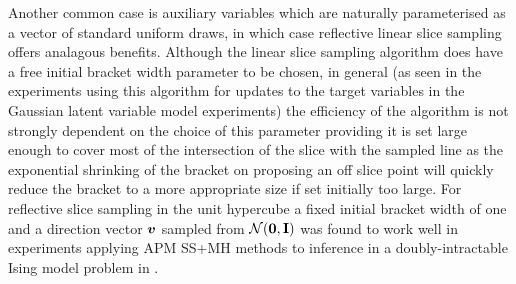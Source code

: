 Another common case is auxiliary variables which are naturally parameterised as a vector of standard uniform draws, in which case reflective linear slice sampling offers analagous benefits. Although the linear slice sampling algorithm does have a free initial bracket width parameter to be chosen, in general (as seen in the experiments using this algorithm for updates to the target variables in the Gaussian latent variable model experiments) the efficiency of the algorithm is not strongly dependent on the choice of this parameter providing it is set large enough to cover most of the intersection of the slice with the sampled line as the exponential shrinking of the bracket on proposing an off slice point will quickly reduce the bracket to a more appropriate size if set initially too large. For reflective slice sampling in the unit hypercube a fixed initial bracket width of one and a direction vector $\boldsymbol{v}$ sampled from $\nrm{\vct{0},\mathbf{I}}$ was found to work well in experiments applying \ac{APM} \ac{SS}+\ac{MH} methods to inference in a doubly-intractable Ising model problem in \citep{murray2016pseudo}.

